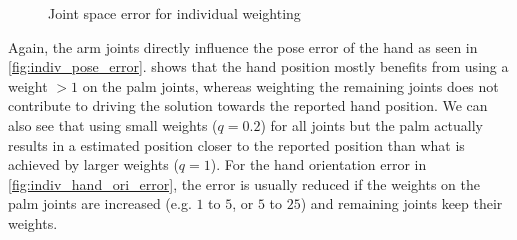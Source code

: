 \begin{figure}[h]
\centering
{}
%

\caption{Joint space error for individual weighting}
\label{fig:indiv_joint_error}
\end{figure}

Again, the arm joints directly influence the pose error of the hand as seen in \cref{fig:indiv_pose_error}.  shows that the hand position mostly benefits from using a weight $>1$ on the palm joints, whereas weighting the remaining joints does not contribute to driving the solution towards the reported hand position. We can also see that using small weights ($q=0.2$) for all joints but the palm actually results in a estimated position closer to the reported position than what is achieved by larger weights ($q=1$).
For the hand orientation error in \cref{fig:indiv_hand_ori_error}, the error is usually reduced if the weights on the palm joints are increased (e.g. $1$ to $5$, or $5$ to $25$) and remaining joints keep their weights.

